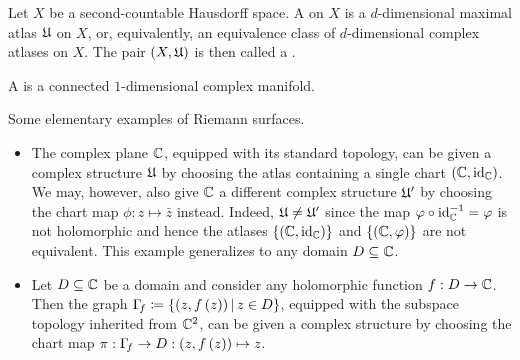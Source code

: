 \documentclass[../Moduli_Spaces_of_Riemann_Surfaces.tex]{subfiles}
\begin{document}
    \begin{definition}
        Let $X$ be a second-countable Hausdorff space. A   on $X$ is a $d$-dimensional maximal atlas $\mathfrak{U}$ on $X$, or, equivalently, an equivalence class of $d$-dimensional complex atlases on $X$. The pair $\left(X,\mathfrak{U}\right)$ is then called a  .
    \end{definition}
    \begin{definition}
        A  is a connected $1$-dimensional complex manifold.
    \end{definition}
    \begin{example}
        Some elementary examples of Riemann surfaces.
        \begin{itemize}
            \item The complex plane $\mathbb{C}$, equipped with its standard topology, can be given a complex structure $\mathfrak{U}$ by choosing the atlas containing a single chart $\left(\mathbb{C},\operatorname{id}_{\mathbb{C}}\right)$. We may, however, also give $\mathbb{C}$ a different complex structure $\mathfrak{U}'$ by choosing the chart map $\phi:z\mapsto\bar{z}$ instead. Indeed, $\mathfrak{U}\neq\mathfrak{U}'$ since the map $\varphi\circ\operatorname{id}_{\mathbb{C}}^{-1}=\varphi$ is not holomorphic and hence the atlases $\left\{\left(\mathbb{C},\operatorname{id}_{\mathbb{C}}\right)\right\}$ and $\left\{\left(\mathbb{C},\varphi\right)\right\}$ are not equivalent. This example generalizes to any domain $D\subseteq\mathbb{C}$.
            \item Let $D\subseteq\mathbb{C}$ be a domain and consider any holomorphic function $f:D\to\mathbb{C}$. Then the graph $\Gamma\!_f\coloneqq\left\{\left(z,f\left(z\right)\right)\,\middle\vert\, z\in D\right\}$, equipped with the subspace topology inherited from $\mathbb{C}^2$, can be given a complex structure by choosing the chart map $\pi:\Gamma\!_f\to D:\left(z,f\left(z\right)\right)\mapsto z$.\exqed
        \end{itemize}
    \end{example}
\end{document}
